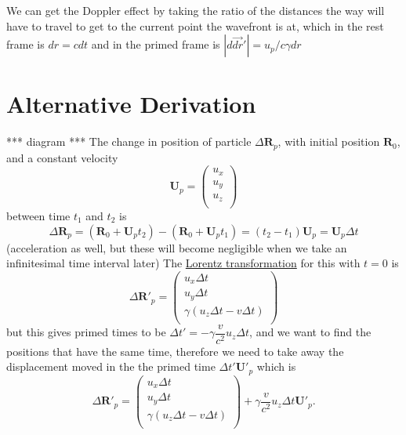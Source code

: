 We can get the Doppler effect by taking the ratio of the distances the way will have to travel to get to the current point the wavefront is at, which in the rest frame is $dr=cdt$ and in the primed frame is $|d\vec{dr}'| = u_p/c \gamma dr$

\chapter{Alternative Derivation}
*** diagram *** \newline
The change in position of particle $\Delta \mathbf{R}_p$, with initial position $\mathbf{R}_0$, and a constant velocity
\begin{equation}%
    \mathbf{U}_p = \begin{pmatrix}
        u_x \\ u_y \\ u_z \\
    \end{pmatrix}
\end{equation}%
between time $t_1$ and $t_2$ is
\begin{equation}%
    \Delta \mathbf{R}_p = (\mathbf{R}_0 +\mathbf{U}_p t_2) - (\mathbf{R}_0 +\mathbf{U}_p t_1) =  (t_2 - t_1) \mathbf{U}_p =  \mathbf{U}_p \Delta t
\end{equation}%
(acceleration as well, but these will become negligible when we take an infinitesimal time interval later)
The \hyperlink{def-lorentz-transform}{Lorentz transformation} for this with $t=0$ is
\begin{equation}%
    \Delta \mathbf{R}'_p = \begin{pmatrix}
        u_x \Delta t \\ u_y \Delta t \\ \gamma \left( u_z \Delta t - v \Delta t \right) \\
    \end{pmatrix}
\end{equation}%
but this gives primed times to be $\Delta t'=-\gamma\dfrac{v}{c^2} u_z \Delta t$, and we want to find the positions that have the same time, therefore we need to take away the displacement moved in the the primed time $\Delta t' \mathbf{U'}_p $ which is
\begin{equation}%
    \Delta \mathbf{R}'_p = \begin{pmatrix}
        u_x \Delta t \\ u_y \Delta t \\ \gamma \left( u_z \Delta t - v \Delta t \right) \\
    \end{pmatrix} + \gamma\dfrac{v}{c^2} u_z \Delta t  \mathbf{U'}_p.
\end{equation}%
